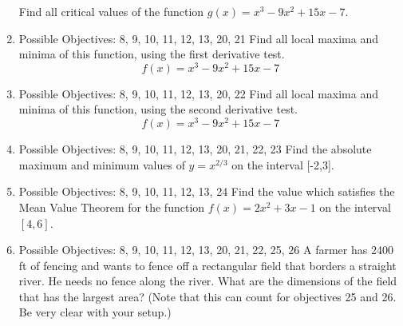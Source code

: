 \documentclass{exam}
\begin{document}
\begin{enumerate}
Find all critical values of the function $g(x) = x^3 - 9x^2 + 15x - 7$.
\item Possible Objectives: 8, 9, 10, 11, 12, 13, 20, 21
Find all local maxima and minima of this function, using the first derivative test.
$$f(x) = x^3 - 9x^2 + 15x - 7$$
\item Possible Objectives: 8, 9, 10, 11, 12, 13, 20, 22
Find all local maxima and minima of this function, using the second derivative test.
$$f(x) = x^3 - 9x^2 + 15x - 7$$
\item Possible Objectives: 8, 9, 10, 11, 12, 13, 20, 21, 22, 23
Find the absolute maximum and minimum values of $y = x^{2/3}$ on the interval [-2,3].
\item Possible Objectives: 8, 9, 10, 11, 12, 13, 24
Find the value which satisfies the Mean Value Theorem for the function $f(x) = 2x^2 + 3x - 1$ on the interval $[4,6]$.
\item Possible Objectives: 8, 9, 10, 11, 12, 13, 20, 21, 22, 25, 26
A farmer has 2400 ft of fencing and wants to fence off a rectangular field that borders a straight river. He needs no fence along the river. What are the dimensions of the field that has the largest area? (Note that this can count for objectives 25 and 26. Be very clear with your setup.)
\end{enumerate}
\end{document}
